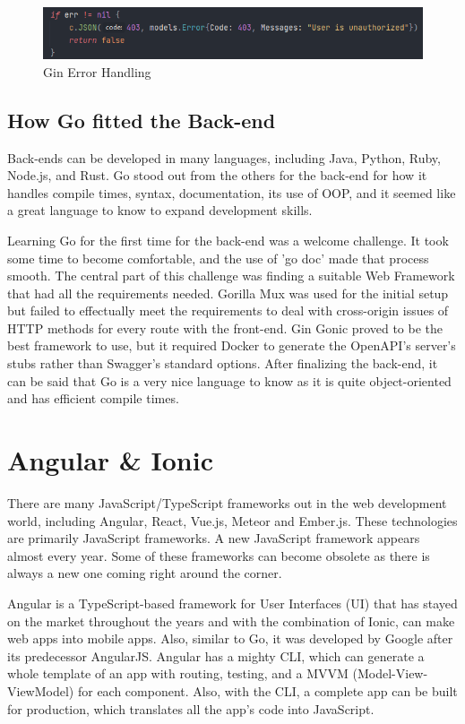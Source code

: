 \begin{figure}[H]
    \caption{Gin Error Handling}
    \label{image:ginError}
    \centering
    \includegraphics[width=1.0\textwidth]{images/misc/cookie-error.png}
\end{figure}

\subsection{How Go fitted the Back-end}
Back-ends can be developed in many languages, including Java, Python, Ruby, Node.js, and Rust. Go stood out from the others for the back-end for how it handles compile times, syntax, documentation, its use of OOP, and it seemed like a great language to know to expand development skills. 

Learning Go for the first time for the back-end was a welcome challenge. It took some time to become comfortable, and the use of 'go doc' made that process smooth. The central part of this challenge was finding a suitable Web Framework that had all the requirements needed. Gorilla Mux was used for the initial setup but failed to effectually meet the requirements to deal with cross-origin issues of HTTP methods for every route with the front-end.
Gin Gonic proved to be the best framework to use, but it required Docker to generate the OpenAPI's server's stubs rather than Swagger's standard options. After finalizing the back-end, it can be said that Go is a very nice language to know as it is quite object-oriented and has efficient compile times. 
 
\section{Angular \& Ionic}
There are many JavaScript/TypeScript frameworks out in the web development world, including Angular, React, Vue.js, Meteor and Ember.js. These technologies are primarily JavaScript frameworks. A new JavaScript framework appears almost every year. Some of these frameworks can become obsolete as there is always a new one coming right around the corner.

Angular is a TypeScript-based framework for User Interfaces (UI) that has stayed on the market throughout the years \cite{ref14} and with the combination of Ionic, can make web apps into mobile apps. Also, similar to Go, it was developed by Google after its predecessor AngularJS. Angular has a mighty CLI, which can generate a whole template of an app with routing, testing, and a MVVM (Model-View-ViewModel) for each component. Also, with the CLI, a complete app can be built for production, which translates all the app's code into JavaScript.

